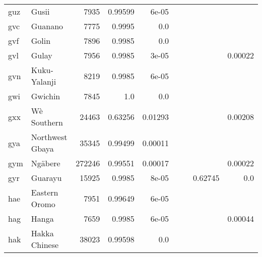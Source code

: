\documentclass[11pt]{article}
\begin{document}
\begin{table*}[h]
{\begin{tabular}{llrrrrrrr}
guz         & Gusii         & 7935         & 0.99599         & 6e-05         &          &          &          &          \\

gvc         & Guanano         & 7775         & 0.9995         & 0.0         &          &          &          &          \\

gvf         & Golin         & 7896         & 0.9985         & 0.0         &          &          &          &          \\

gvl         & Gulay         & 7956         & 0.9985         & 3e-05         &          &          &          & 0.00022         \\

gvn         & Kuku-Yalanji         & 8219         & 0.9985         & 6e-05         &          &          &          &          \\

gwi         & Gwichin         & 7845         & 1.0         & 0.0         &          &          &          &          \\

gxx         & Wè Southern         & 24463         & 0.63256         & 0.01293         &          &          &          & 0.00208         \\

gya         & Northwest Gbaya         & 35345         & 0.99499         & 0.00011         &          &          &          &          \\

gym         & Ngäbere         & 272246         & 0.99551         & 0.00017         &          &          &          & 0.00022         \\

gyr         & Guarayu         & 15925         & 0.9985         & 8e-05         &          &          & 0.62745         & 0.0         \\

hae         & Eastern Oromo         & 7951         & 0.99649         & 6e-05         &          &          &          &          \\

hag         & Hanga         & 7659         & 0.9985         & 6e-05         &          &          &          & 0.00044         \\

hak         & Hakka Chinese         & 38023         & 0.99598         & 0.0         &          &          &          &          \\


\end{tabular}}
\end{table*}
\end{document}
